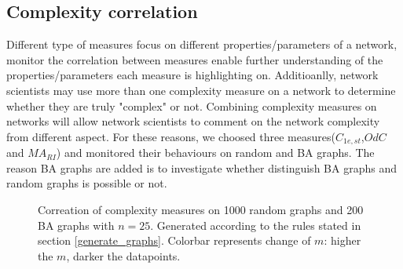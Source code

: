 \documentclass[12pt]{article}
\begin{document}
\subsection{Complexity correlation}
Different type of measures focus on different properties/parameters of a network, monitor the correlation between measures enable further understanding of the properties/parameters each measure is highlighting on. Additioanlly, network scientists may use more than one complexity measure on a network to determine whether they are truly "complex" or not. Combining complexity measures on networks will allow network scientists to comment on the network complexity from different aspect. For these reasons, we choosed three measures($C_{1e,st}$,$OdC$ and $MA_{RI}$) and monitored their behaviours on random and BA graphs. The reason BA graphs are added is to investigate whether distinguish BA graphs and random graphs is possible or not.\\
\begin{figure}[h!]
    \caption{Correation of complexity measures on 1000 random graphs and 200 BA graphs with $n=25$. Generated according to the rules stated in section \ref{generate_graphs}. Colorbar represents change of $m$: higher the $m$, darker the datapoints.}
    \label{fig:correlation}
\end{figure}
\end{document}
